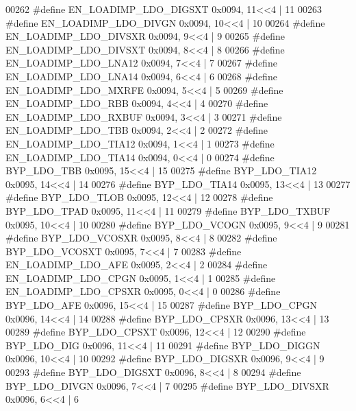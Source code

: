 \begin{DoxyCode}
00262 \textcolor{preprocessor}{#define EN\_LOADIMP\_LDO\_DIGSXT 0x0094, 11<<4 |  11}
00263 \textcolor{preprocessor}{#define EN\_LOADIMP\_LDO\_DIVGN 0x0094, 10<<4 |  10}
00264 \textcolor{preprocessor}{#define EN\_LOADIMP\_LDO\_DIVSXR 0x0094, 9<<4 |  9}
00265 \textcolor{preprocessor}{#define EN\_LOADIMP\_LDO\_DIVSXT 0x0094, 8<<4 |  8}
00266 \textcolor{preprocessor}{#define EN\_LOADIMP\_LDO\_LNA12 0x0094, 7<<4 |  7}
00267 \textcolor{preprocessor}{#define EN\_LOADIMP\_LDO\_LNA14 0x0094, 6<<4 |  6}
00268 \textcolor{preprocessor}{#define EN\_LOADIMP\_LDO\_MXRFE 0x0094, 5<<4 |  5}
00269 \textcolor{preprocessor}{#define EN\_LOADIMP\_LDO\_RBB 0x0094, 4<<4 |  4}
00270 \textcolor{preprocessor}{#define EN\_LOADIMP\_LDO\_RXBUF 0x0094, 3<<4 |  3}
00271 \textcolor{preprocessor}{#define EN\_LOADIMP\_LDO\_TBB 0x0094, 2<<4 |  2}
00272 \textcolor{preprocessor}{#define EN\_LOADIMP\_LDO\_TIA12 0x0094, 1<<4 |  1}
00273 \textcolor{preprocessor}{#define EN\_LOADIMP\_LDO\_TIA14 0x0094, 0<<4 |  0}
00274 \textcolor{preprocessor}{#define BYP\_LDO\_TBB 0x0095, 15<<4 |  15}
00275 \textcolor{preprocessor}{#define BYP\_LDO\_TIA12 0x0095, 14<<4 |  14}
00276 \textcolor{preprocessor}{#define BYP\_LDO\_TIA14 0x0095, 13<<4 |  13}
00277 \textcolor{preprocessor}{#define BYP\_LDO\_TLOB 0x0095, 12<<4 |  12}
00278 \textcolor{preprocessor}{#define BYP\_LDO\_TPAD 0x0095, 11<<4 |  11}
00279 \textcolor{preprocessor}{#define BYP\_LDO\_TXBUF 0x0095, 10<<4 |  10}
00280 \textcolor{preprocessor}{#define BYP\_LDO\_VCOGN 0x0095, 9<<4 |  9}
00281 \textcolor{preprocessor}{#define BYP\_LDO\_VCOSXR 0x0095, 8<<4 |  8}
00282 \textcolor{preprocessor}{#define BYP\_LDO\_VCOSXT 0x0095, 7<<4 |  7}
00283 \textcolor{preprocessor}{#define EN\_LOADIMP\_LDO\_AFE 0x0095, 2<<4 |  2}
00284 \textcolor{preprocessor}{#define EN\_LOADIMP\_LDO\_CPGN 0x0095, 1<<4 |  1}
00285 \textcolor{preprocessor}{#define EN\_LOADIMP\_LDO\_CPSXR 0x0095, 0<<4 |  0}
00286 \textcolor{preprocessor}{#define BYP\_LDO\_AFE 0x0096, 15<<4 |  15}
00287 \textcolor{preprocessor}{#define BYP\_LDO\_CPGN 0x0096, 14<<4 |  14}
00288 \textcolor{preprocessor}{#define BYP\_LDO\_CPSXR 0x0096, 13<<4 |  13}
00289 \textcolor{preprocessor}{#define BYP\_LDO\_CPSXT 0x0096, 12<<4 |  12}
00290 \textcolor{preprocessor}{#define BYP\_LDO\_DIG 0x0096, 11<<4 |  11}
00291 \textcolor{preprocessor}{#define BYP\_LDO\_DIGGN 0x0096, 10<<4 |  10}
00292 \textcolor{preprocessor}{#define BYP\_LDO\_DIGSXR 0x0096, 9<<4 |  9}
00293 \textcolor{preprocessor}{#define BYP\_LDO\_DIGSXT 0x0096, 8<<4 |  8}
00294 \textcolor{preprocessor}{#define BYP\_LDO\_DIVGN 0x0096, 7<<4 |  7}
00295 \textcolor{preprocessor}{#define BYP\_LDO\_DIVSXR 0x0096, 6<<4 |  6}

\end{DoxyCode}
